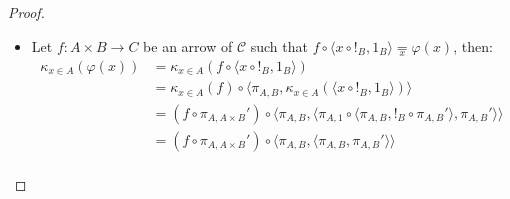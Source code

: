 \begin{proof}
\begin{itemize}
\begin{itemize}
\begin{align*}
            \end{align*}
            \item if $\varphi(x) = \psi(x)^*$, with $\psi(x) : B \times E \to D$ and $C = D^E$, then:
            \begin{align*}
                \kappa_{x \in A}(\psi(x)^*) \circ \langle x \circ !_B, 1_B\rangle &\underset{x}{=} (\kappa_{x \in A}\psi(x) \circ \alpha_{A,B,E})^* \circ \langle x \circ !_B, 1_B\rangle \\
                                                                                  &\underset{x}{=} (\kappa_{x \in A}\psi(x) \circ \alpha_{A,B,E} \circ (\langle x \circ !_B, 1_B\rangle \times 1_E))^* &&(\textnormal{by $\clubsuit$})\\
                                                                                  &\underset{x}{=} (\kappa_{x \in A}\psi(x) \circ \langle x \circ !_{B \times E}, 1_{B \times E}\rangle)^* &&(\textnormal{by $\heartsuit$})\\
                                                                                  &\underset{x}{=} \psi(x)^*,
            \end{align*}
            where $\clubsuit$ is the identity $f^* \circ g = (f \circ (g \times 1_E))^*$, for every $f : Y \times E \to D$ and $g : X \to Y$; $\heartsuit$ is the identity
            \[ \alpha_{A,B,E} \circ (\langle x \circ !_B, 1_B\rangle \times 1_E) = \langle x \circ !_{B \times E}, 1_{B \times E}\rangle, \]
            that can be proved using the definition of $\alpha_{A,B,E}$, and the last equality is by the inductive hypothesis.
        \end{itemize}
        \item[$\boxed{\textnormal{uniqueness}}$] Let $f : A \times B \to C$ be an arrow of $\mathcal C$ such that $f \circ \langle x \circ !_B, 1_B\rangle \underset{x}{=} \varphi(x)$, then:
        \begin{align*}
            \kappa_{x \in A}(\varphi(x)) &= \kappa_{x \in A}(f \circ \langle x \circ !_B, 1_B\rangle) \\
                                         &= \kappa_{x \in A}(f) \circ \langle \pi_{A,B}, \kappa_{x \in A}(\langle x \circ !_B, 1_B\rangle)\rangle \\
                                         &= (f \circ \pi_{A,A \times B}') \circ \langle \pi_{A,B}, \langle \pi_{A,1} \circ \langle \pi_{A,B}, !_B \circ \pi_{A,B}'\rangle, \pi_{A,B}' \rangle \rangle \\
                                         &= (f \circ \pi_{A,A \times B}') \circ \langle \pi_{A,B}, \langle \pi_{A,B}, \pi_{A,B}' \rangle \rangle \\

\end{align*}
\end{itemize}
\end{proof}
